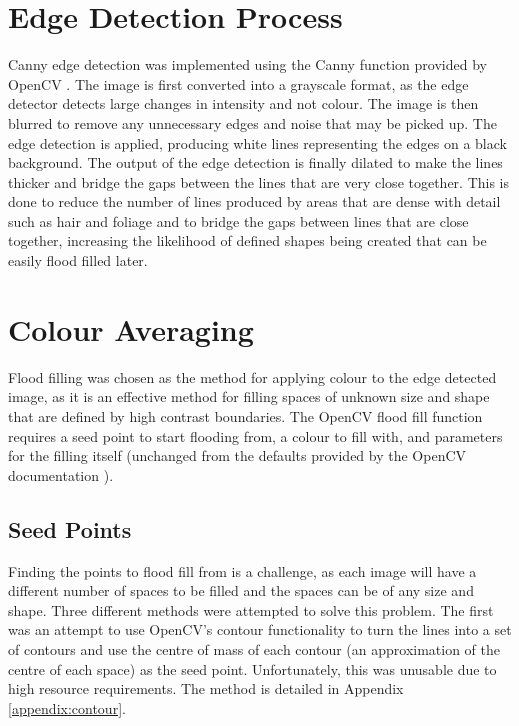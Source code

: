 \section{Edge Detection Process}

Canny edge detection was implemented using the Canny function provided by OpenCV \cite{OpenCV}. The image is first converted into a grayscale format, as the edge detector detects large changes in intensity and not colour. The image is then blurred to remove any unnecessary edges and noise that may be picked up. The edge detection is applied, producing white lines representing the edges on a black background. The output of the edge detection is finally dilated to make the lines thicker and bridge the gaps between the lines that are very close together. This is done to reduce the number of lines produced by areas that are dense with detail such as hair and foliage and to bridge the gaps between lines that are close together, increasing the likelihood of defined shapes being created that can be easily flood filled later.

\section{Colour Averaging}

Flood filling was chosen as the method for applying colour to the edge detected image, as it is an effective method for filling spaces of unknown size and shape that are defined by high contrast boundaries. The OpenCV flood fill function requires a seed point to start flooding from, a colour to fill with, and parameters for the filling itself (unchanged from the defaults provided by the OpenCV documentation \cite{opencvffilldemo}).

\subsection{Seed Points}

Finding the points to flood fill from is a challenge, as each image will have a different number of spaces to be filled and the spaces can be of any size and shape. Three different methods were attempted to solve this problem. The first was an attempt to use OpenCV's contour functionality to turn the lines into a set of contours and use the centre of mass of each contour (an approximation of the centre of each space) as the seed point. Unfortunately, this was unusable due to high resource requirements. The method is detailed in Appendix \ref{appendix:contour}.


